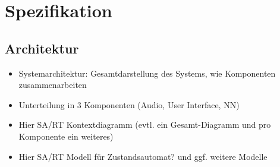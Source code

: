 \newpage
\section{Spezifikation}
\subsection{Architektur}
\begin{itemize}
    \item Systemarchitektur: Gesamtdarstellung des Systems, wie Komponenten zusammenarbeiten
    \item Unterteilung in 3 Komponenten (Audio, User Interface, NN)
    \item Hier SA/RT Kontextdiagramm (evtl. ein Gesamt-Diagramm und pro Komponente ein weiteres)
    \item Hier SA/RT Modell für Zustandsautomat? und ggf. weitere Modelle
\end{itemize}